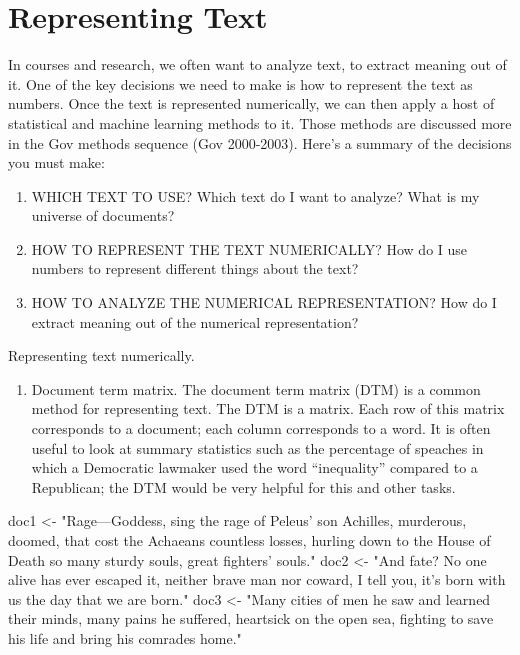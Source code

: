\documentclass[]{book}
\newenvironment{Shaded}{\begin{snugshade}}{\end{snugshade}}
\newcommand{\StringTok}[1]{\textcolor[rgb]{0.31,0.60,0.02}{#1}}
\newcommand{\NormalTok}[1]{#1}
\providecommand{\tightlist}{%
  \setlength{\itemsep}{0pt}\setlength{\parskip}{0pt}}
\theoremstyle{definition}
\theoremstyle{definition}
\theoremstyle{definition}
\theoremstyle{remark}
\begin{document}
\section{Representing Text}\label{representing-text}

In courses and research, we often want to analyze text, to extract
meaning out of it. One of the key decisions we need to make is how to
represent the text as numbers. Once the text is represented numerically,
we can then apply a host of statistical and machine learning methods to
it. Those methods are discussed more in the Gov methods sequence (Gov
2000-2003). Here's a summary of the decisions you must make:

\begin{enumerate}
\def\labelenumi{\arabic{enumi}.}
\tightlist
\item
  WHICH TEXT TO USE? Which text do I want to analyze? What is my
  universe of documents?
\item
  HOW TO REPRESENT THE TEXT NUMERICALLY? How do I use numbers to
  represent different things about the text?
\item
  HOW TO ANALYZE THE NUMERICAL REPRESENTATION? How do I extract meaning
  out of the numerical representation?
\end{enumerate}

Representing text numerically.

\begin{enumerate}
\def\labelenumi{\arabic{enumi}.}
\tightlist
\item
  Document term matrix. The document term matrix (DTM) is a common
  method for representing text. The DTM is a matrix. Each row of this
  matrix corresponds to a document; each column corresponds to a word.
  It is often useful to look at summary statistics such as the
  percentage of speaches in which a Democratic lawmaker used the word
  ``inequality'' compared to a Republican; the DTM would be very helpful
  for this and other tasks.
\end{enumerate}

\begin{Shaded}
\begin{Highlighting}[]
\NormalTok{doc1 <-}\StringTok{ "Rage---Goddess, sing the rage of Peleus’ son Achilles,}
\StringTok{         murderous, doomed, that cost the Achaeans countless losses,}
\StringTok{         hurling down to the House of Death so many sturdy souls,}
\StringTok{         great fighters’ souls."}
\NormalTok{doc2 <-}\StringTok{ "And fate? No one alive has ever escaped it,}
\StringTok{         neither brave man nor coward, I tell you, }
\StringTok{         it's born with us the day that we are born."}
\NormalTok{doc3 <-}\StringTok{ "Many cities of men he saw and learned their minds,}
\StringTok{         many pains he suffered, heartsick on the open sea,}
\StringTok{         fighting to save his life and bring his comrades home."}
\end{Highlighting}
\end{Shaded}
\end{document}
